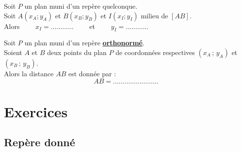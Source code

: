 \begin{prop*}
 Soit $P$ un plan muni d'un rep\`ere quelconque.\\
 Soit $A(x_A;y_A)$ et $B(x_B;y_B)$ et $I(x_I;y_I)$ milieu de $[AB]$. \\
Alors $\qquad x_I=\ldots\ldots\ldots\ldots \qquad $ et $\qquad  y_I=\ldots\ldots\ldots\ldots$
\end{prop*}


\begin{prop*}
 Soit $P$ un plan muni d'un rep\`ere \underline{\textbf{orthonorm\'e}}.\\
 Soient $A$ et $B$ deux points du plan $P$ de coordonn\'ees respectives $(x_A\,;\,y_A)$ et $(x_B\,;\,y_B)$.\\
 Alors la distance $AB$ est donn\'ee par :
 \[AB=\ldots\ldots\ldots\ldots\ldots\ldots\ldots\ldots\]
\end{prop*}




\sautpage

\section{Exercices}

\subsection{Rep\`ere donn\'e}


